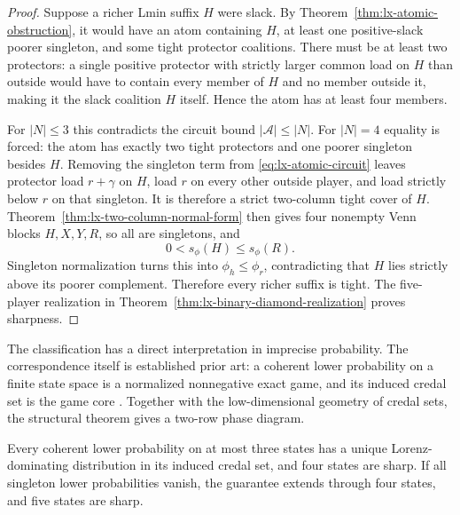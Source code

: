 \begin{proof}
Suppose a richer Lmin suffix $H$ were slack.  By
Theorem~\ref{thm:lx-atomic-obstruction}, it would have an atom containing
$H$, at least one positive-slack poorer singleton, and some tight protector
coalitions.  There must be at least two protectors: a single positive
protector with strictly larger common load on $H$ than outside would have to
contain every member of $H$ and no member outside it, making it the slack
coalition $H$ itself.  Hence the atom has at least four members.

For $|N|\leq3$ this contradicts the circuit bound
$|\mathcal A|\leq|N|$.  For $|N|=4$ equality is forced: the atom has exactly
two tight protectors and one poorer singleton besides $H$.  Removing the
singleton term from \eqref{eq:lx-atomic-circuit} leaves protector load
$r+\gamma$ on $H$, load $r$ on every other outside player, and load strictly
below $r$ on that singleton.  It is therefore a strict two-column tight
cover of $H$.  Theorem~\ref{thm:lx-two-column-normal-form} then gives
four nonempty Venn blocks $H,X,Y,R$, so all are singletons, and
\[
 0<s_\phi(H)\leq s_\phi(R).
\]
Singleton normalization turns this into $\phi_h\leq\phi_r$, contradicting
that $H$ lies strictly above its poorer complement.  Therefore every richer
suffix is tight.  The five-player realization in
Theorem~\ref{thm:lx-binary-diamond-realization} proves sharpness.
\end{proof}

The classification has a direct interpretation in imprecise probability.
The correspondence itself is established prior art: a coherent lower
probability on a finite state space is a normalized nonnegative exact game,
and its induced credal set is the game core
\citep{StudenyKratochvil2017}.  Together with the low-dimensional geometry of
credal sets, the structural theorem gives a two-row phase diagram.

\begin{theorem}
\label{thm:lx-credal-lorenz-phase-diagram}
Every coherent lower probability on at most three states has a unique
Lorenz-dominating distribution in its induced credal set, and four states are
sharp.  If all singleton lower probabilities vanish, the guarantee extends
through four states, and five states are sharp.
\end{theorem}

